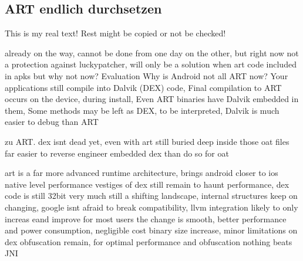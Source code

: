 \subsection{ART endlich durchsetzen} \label{subsection:evaluation-external-art}
This is my real text! Rest might be copied or not be checked!

already on the way, cannot be done from one day on the other, but right now not a protection against luckypatcher, will only be a solution when art code included in apks
but why not now?
%
Evaluation
Why is Android not all ART now? Your applications still compile into Dalvik (DEX) code, Final compilation to ART occurs on the device, during install, Even ART binaries have Dalvik embedded in them, Some methods may be left as DEX, to be interpreted, Dalvik is much easier to debug than ART\newline
\cite{andevconDalvikART}
%

%
zu ART.
dex isnt dead yet, even with art
still buried deep inside those oat files
far easier to reverse engineer embedded dex than do so for oat

art is a far more advanced runtime architecture, brings android closer to ios native level performance
vestiges of dex still remain to haunt performance, dex code is still 32bit
very much still a shifting landscape, internal structures keep on changing, google isnt afraid to break compatibility, llvm integration likely to only increas eand improve
for most users the change is smooth, better performance and power consumption, negligible cost binary size increase, minor limitations on dex obfuscation remain, for optimal performance and obfuscation nothing beats JNI
\cite{andevconDalvikART}
%
